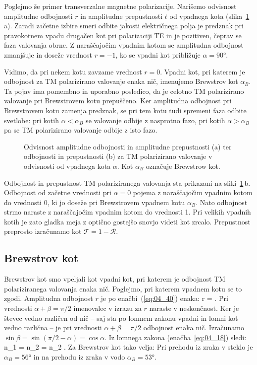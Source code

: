 Poglejmo še primer transverzalne magnetne polarizacije. Narišemo odvisnost
amplitudne odbojnosti $r$ in amplitudne prepustnosti $t$ od vpadnega kota 
(slika~\ref{fig:04_redtm}\,a). Zaradi začetne izbire smeri odbite jakosti
električnega polja je predznak pri pravokotnem vpadu drugačen kot pri 
polarizaciji TE in je pozitiven, čeprav se faza valovanja obrne. 
Z naraščajočim vpadnim kotom se amplitudna
odbojnost zmanjšuje in doseže vrednost $r=-1$, ko se vpadni kot
približuje $\alpha = 90\si{\degree}$. 

Vidimo, da pri nekem kotu zavzame  
vrednost $r = 0$. Vpadni kot, pri katerem je odbojnost za TM polarizirano
valovanje enaka nič, imenujemo Brewstrov kot $\alpha_B$. Ta pojav ima pomembno in uporabno
posledico, da je celotno TM polarizirano valovanje pri Brewstrovem kotu prepuščeno. 
Ker amplitudna odbojnost pri Brewstrovem kotu zamenja predznak, se pri tem
kotu tudi spremeni faza odbite svetlobe: pri kotih $\alpha < \alpha_B$ se valovanje
odbije z nasprotno fazo, pri kotih $\alpha > \alpha_B$ pa se TM polarizirano
valovanje odbije z isto fazo.
\begin{figure}[ht]
\centering
\def\svgwidth{140truemm} 

\caption{Odvisnost amplitudne odbojnosti in amplitudne prepustnosti (a) ter odbojnosti in 
prepustnosti (b) za TM polarizirano valovanje v odvisnosti od vpadnega kota $\alpha$. Kot
$\alpha_B$ označuje Brewstrow kot.}
\label{fig:04_redtm}
\end{figure}

Odbojnost in prepustnost TM polariziranega valovanja sta prikazani na 
sliki~\ref{fig:04_redtm}\,b. Odbojnost od začetne vrednosti pri $\alpha=0$
pojema z naraščajočim vpadnim kotom do vrednosti 0, ki jo doseže pri 
Brewstrovem vpadnem kotu $\alpha_B$. Nato odbojnost strmo naraste z naraščajočim vpadnim
kotom do vrednosti 1. Pri velikih vpadnih kotih je zato
gladka meja z optično gostejšo snovjo videti kot zrcalo. Prepustnost preprosto izračunamo 
kot $\mathcal{T} = 1- \mathcal{R}$.

\subsection*{Brewstrov kot}
Brewstrov kot smo vpeljali kot vpadni kot, pri katerem je odbojnost
TM polariziranega valovanja enaka nič. Poglejmo, pri katerem
vpadnem kotu se to zgodi. Amplitudna odbojnost $r$ je po enačbi~(\ref{eq:04_40})
enaka:
\beq
r = \frac{\tan(\alpha-\beta)}{\tan(\alpha+\beta)}.
\label{eq:04_50}
\eeq
Pri vrednosti $\alpha + \beta = \pi/2$ imenovalec v izrazu za $r$ 
naraste v neskončnost. Ker je števec vedno različen od nič -- saj
sta po lomnem zakonu vpadni in lomni kot vedno različna -- je pri 
vrednosti $\alpha + \beta = \pi/2$ odbojnost enaka nič.
Izračunamo $\sin \beta = \sin (\pi/2-\alpha) = \cos \alpha$. 
Iz lomnega zakona (enačba~\ref{eq:04_18}) sledi:
\beq
n_1 \sin \alpha= n_2 \sin \beta= n_2 \cos \alpha.
\label{eq:04_51}
\eeq
Za Brewstrov kot tako velja:
Pri prehodu iz zraka v steklo je $\alpha_B = 56\si{\degree}$ in na prehodu
iz zraka v vodo $\alpha_B = 53\si{\degree}$. 

